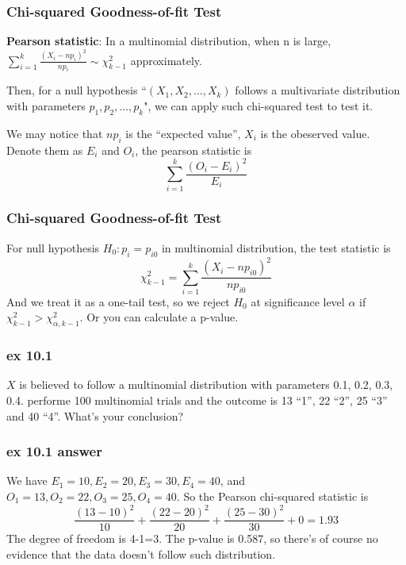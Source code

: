 \documentclass{beamer}
\begin{document}
\begin{frame}
    \frametitle{Chi-squared Goodness-of-fit Test}

    \textbf{Pearson statistic}: In a multinomial distribution, when n is large, $\sum\limits_{i=1}^{k}\frac{(X_i-np_i)^2}{np_i}\sim \chi^2_{k-1}$ approximately.\par
    \vspace{0.3cm}
    Then, for a null hypothesis ``$(X_1, X_2, \dots , X_k)$ follows a multivariate distribution with parameters $p_1, p_2, \dots , p_k$", we can apply such chi-squared test to test it.\par
    We may notice that $np_i$ is the ``expected value'', $X_i$ is the obeserved value. Denote them as $E_i$ and $O_i$, the pearson statistic is 
    \[\sum\limits_{i=1}^{k}\frac{(O_i-E_i)^2}{E_i}\]

\end{frame}

\begin{frame}
    \frametitle{Chi-squared Goodness-of-fit Test}
    For null hypothesis $H_0: p_i=p_{i0}$ in multinomial distribution, the test statistic is
    \[\chi^2_{k-1}=\sum\limits_{i=1}^{k}\frac{(X_i-np_{i0})^2}{np_{i0}}\]
    And we treat it as a one-tail test, so we reject $H_0$ at significance level $\alpha$ if $\chi^2_{k-1}>\chi^2_{\alpha, k-1}$. Or you can calculate a p-value.

\end{frame}

\begin{frame}
    \frametitle{ex 10.1}

    $X$ is believed to follow a multinomial distribution with parameters 0.1, 0.2, 0.3, 0.4. performe 100 multinomial trials and the outcome is 13 ``1'', 22 ``2'', 25 ``3'' and 40 ``4''. What's your conclusion?

\end{frame}

\begin{frame}
    \frametitle{ex 10.1 answer}

    We have $E_1=10, E_2=20, E_3=30, E_4=40$, and $O_1=13, O_2=22, O_3=25, O_4=40$. So the Pearson chi-squared statistic is 
    \[\frac{(13-10)^2}{10}+\frac{(22-20)^2}{20}+\frac{(25-30)^2}{30}+0=1.93\]
    The degree of freedom is 4-1=3. The p-value is 0.587, so there's of course no evidence that the data doesn't follow such distribution.

\end{frame}
\end{document}
